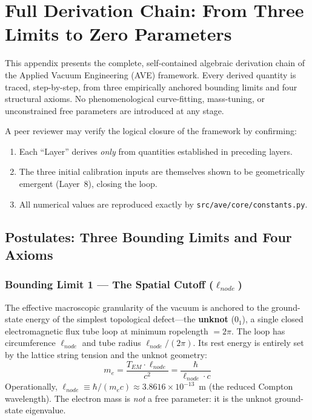
\chapter{Full Derivation Chain: From Three Limits to Zero Parameters}
\label{app:full_derivation_chain}

This appendix presents the complete, self-contained algebraic derivation chain
of the Applied Vacuum Engineering (AVE) framework. Every derived quantity is
traced, step-by-step, from three empirically anchored bounding limits and four
structural axioms. No phenomenological curve-fitting, mass-tuning, or
unconstrained free parameters are introduced at any stage.

A peer reviewer may verify the logical closure of the framework by confirming:
\begin{enumerate}
    \item Each ``Layer'' derives \textit{only} from quantities established in
          preceding layers.
    \item The three initial calibration inputs are themselves shown to be
          geometrically emergent (Layer~8), closing the loop.
    \item All numerical values are reproduced exactly by
          \texttt{src/ave/core/constants.py}.
\end{enumerate}

\section{Postulates: Three Bounding Limits and Four Axioms}
\label{sec:postulates}

\subsection*{Bounding Limit 1 --- The Spatial Cutoff ($\ell_{node}$)}

The effective macroscopic granularity of the vacuum is anchored to the
ground-state energy of the simplest topological defect---the \textbf{unknot}
($0_1$), a single closed electromagnetic flux tube loop at minimum ropelength
$= 2\pi$. The loop has circumference $\ell_{node}$ and tube radius
$\ell_{node}/(2\pi)$. Its rest energy is entirely set by the lattice string
tension and the unknot geometry:
\begin{equation}
    m_e = \frac{T_{EM} \cdot \ell_{node}}{c^2}
    = \frac{\hbar}{\ell_{node} \cdot c}
    \label{eq:me_unknot}
\end{equation}
Operationally, $\ell_{node} \equiv \hbar / (m_e c) \approx 3.8616 \times
10^{-13}$~m (the reduced Compton wavelength). The electron mass is
\textit{not} a free parameter: it is the unknot ground-state eigenvalue.

